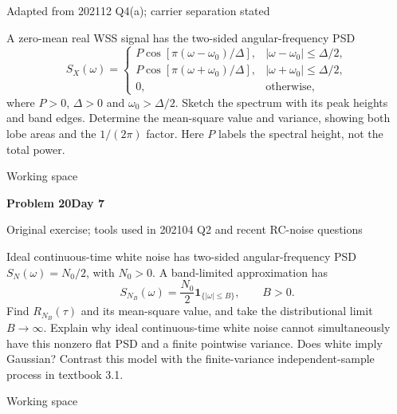 \documentclass[11pt]{article}
\newcommand{\qtitle}[2]{\clearpage\begin{tcolorbox}[colback=navy,colframe=navy,arc=1.5pt,boxrule=0pt]\color{white}\large\bfseries #1\hfill\small #2\end{tcolorbox}}
\begin{document}
{\small\color{accentred}Adapted from 202112 Q4(a); carrier separation stated}\par{}\par{}\par\smallskip\begin{tcolorbox}[colback=qbg,colframe=qbg,boxrule=0pt]A zero-mean real WSS signal has the two-sided angular-frequency PSD
\[S_X(\omega)=\begin{cases}
P\cos[\pi(\omega-\omega_0)/\Delta],&|\omega-\omega_0|\leq\Delta/2,\\
P\cos[\pi(\omega+\omega_0)/\Delta],&|\omega+\omega_0|\leq\Delta/2,\\
0,&\text{otherwise},
\end{cases}\]
where $P>0$, $\Delta>0$ and $\omega_0>\Delta/2$. Sketch the spectrum with its peak heights and band edges. Determine the mean-square value and variance, showing both lobe areas and the $1/(2\pi)$ factor. Here $P$ labels the spectral height, not the total power.\end{tcolorbox}\smallskip\begin{workspace}\hfill{\color{linec}\footnotesize Working space}\end{workspace}
\qtitle{Problem 20}{Day 7}
{\small\color{accentred}Original exercise; tools used in 202104 Q2 and recent RC-noise questions}\par{}\par{}\par\smallskip\begin{tcolorbox}[colback=qbg,colframe=qbg,boxrule=0pt]Ideal continuous-time white noise has two-sided angular-frequency PSD $S_N(\omega)=N_0/2$, with $N_0>0$. A band-limited approximation has
\[S_{N_B}(\omega)=\frac{N_0}{2}\mathbf1_{\{|\omega|\leq B\}},\qquad B>0.\]
Find $R_{N_B}(\tau)$ and its mean-square value, and take the distributional limit $B\to\infty$. Explain why ideal continuous-time white noise cannot simultaneously have this nonzero flat PSD and a finite pointwise variance. Does white imply Gaussian? Contrast this model with the finite-variance independent-sample process in textbook 3.1.\end{tcolorbox}\smallskip\begin{workspace}\hfill{\color{linec}\footnotesize Working space}\end{workspace}
\end{document}
